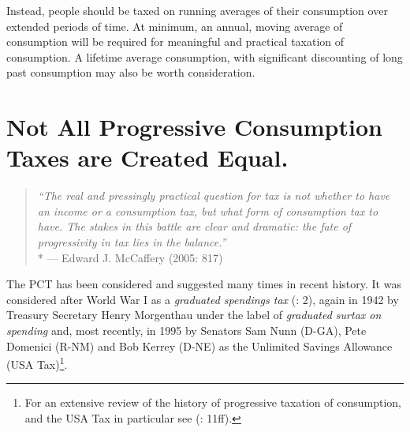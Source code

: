 Instead, people should be taxed on running averages of their consumption over extended periods of time. At minimum, an annual, moving average of consumption will be required for meaningful and practical taxation of consumption. A lifetime average consumption, with significant discounting of long past consumption may also be worth consideration. 


\section[The PCT's Evil Twins]{Not All Progressive Consumption Taxes are Created Equal.}

\begin{quote}
	\emph{``The real and pressingly practical question for tax is not whether to have an income or a consumption tax, but what form of consumption tax to have. The stakes in this battle are clear and dramatic: the fate of progressivity in tax lies in the balance.''}\\*
	--- Edward J. McCaffery (2005: 817)
\end{quote}

 \label{sec:PCTTwins} The PCT has been considered and suggested many times in recent history. It was considered after World War I as a \emph{graduated spendings tax} (\citealt{Bank2004}: 2), again in 1942 by Treasury Secretary Henry Morgenthau under the label of \emph{graduated surtax on spending} and, most recently, in 1995 by Senators Sam Nunn (D-GA), Pete Domenici (R-NM) and Bob Kerrey (D-NE) as the Unlimited Savings Allowance (USA Tax)\footnote{
	For an extensive review of the history of progressive taxation of consumption, and the USA Tax in particular see \citeauthor{Seidman1997} (\citeyear{Seidman1997}: 11ff).}. 




